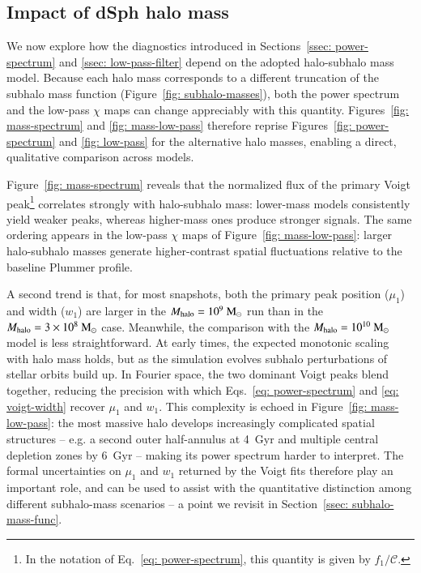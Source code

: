 \documentclass[fleqn,usenatbib]{mnras}
\newcommand{\msun}{\rm M_\odot}
\begin{document}
\subsection{Impact of dSph halo mass}
\label{ssec: impact-halo-mass}

We now explore how the diagnostics introduced in Sections~\ref{ssec: power-spectrum} and \ref{ssec: low-pass-filter} depend on the adopted halo-subhalo mass model. Because each halo mass corresponds to a different truncation of the subhalo mass function (Figure~\ref{fig: subhalo-masses}), both the power spectrum and the low-pass $\chi$ maps can change appreciably with this quantity. Figures~\ref{fig: mass-spectrum} and \ref{fig: mass-low-pass} therefore reprise Figures~\ref{fig: power-spectrum} and \ref{fig: low-pass} for the alternative halo masses, enabling a direct, qualitative comparison across models.

Figure~\ref{fig: mass-spectrum} reveals that the normalized flux of the primary Voigt peak\footnote{In the notation of Eq.~\ref{eq: power-spectrum}, this quantity is given by $f_{1}/\mathcal{C}$.} correlates strongly with halo-subhalo mass: lower-mass models consistently yield weaker peaks, whereas higher-mass ones produce stronger signals. The same ordering appears in the low-pass $\chi$ maps of Figure~\ref{fig: mass-low-pass}: larger halo-subhalo masses generate higher-contrast spatial fluctuations relative to the baseline Plummer profile. 

A second trend is that, for most snapshots, both the primary peak position ($\mu_{1}$) and width ($w_{1}$) are larger in the $M_{\rm halo}=10^{9}~\msun$ run than in the $M_{\rm halo}=3\times10^{8}~\msun$ case. Meanwhile, the comparison with the $M_{\rm halo}=10^{10}~\msun$ model is less straightforward. At early times, the expected monotonic scaling with halo mass holds, but as the simulation evolves subhalo perturbations of stellar orbits build up. In Fourier space, the two dominant Voigt peaks blend together, reducing the precision with which Eqs.~\ref{eq: power-spectrum} and \ref{eq: voigt-width} recover $\mu_{1}$ and $w_{1}$. This complexity is echoed in Figure~\ref{fig: mass-low-pass}: the most massive halo develops increasingly complicated spatial structures -- e.g. a second outer half-annulus at 4~Gyr and multiple central depletion zones by 6~Gyr -- making its power spectrum harder to interpret. The formal uncertainties on $\mu_{1}$ and $w_{1}$ returned by the Voigt fits therefore play an important role, and can be used to assist with the quantitative distinction among different subhalo-mass scenarios -- a point we revisit in Section~\ref{ssec: subhalo-mass-func}.
\end{document}
